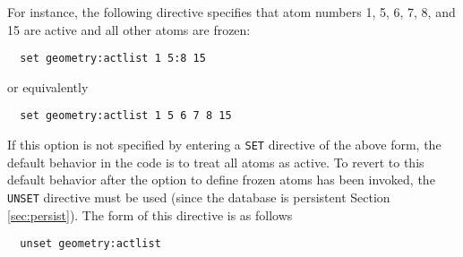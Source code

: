 For instance, the following directive specifies that atom numbers 1,
5, 6, 7, 8, and 15 are active and all other atoms are frozen:
\begin{verbatim}
  set geometry:actlist 1 5:8 15
\end{verbatim}
or equivalently
\begin{verbatim}
  set geometry:actlist 1 5 6 7 8 15
\end{verbatim}


If this option is not specified by entering a \verb+SET+ directive 
of the above form, the default behavior in the code is to treat
all atoms as active.  To revert to this default behavior after the
option to define frozen atoms has been invoked, the \verb+UNSET+
directive must be used
(since
the database is persistent Section \ref{sec:persist}).  The form of
this directive is as follows
\begin{verbatim}
  unset geometry:actlist
\end{verbatim}




